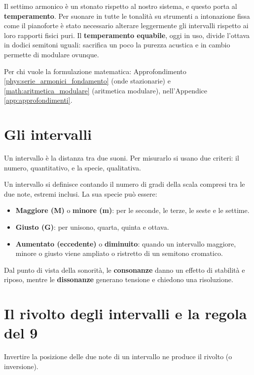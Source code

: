 Il settimo armonico è un \Sibemolle{} stonato rispetto al nostro sistema, e questo porta al \textbf{temperamento}. Per suonare in tutte le tonalità su strumenti a intonazione fissa come il pianoforte è stato necessario alterare leggermente gli intervalli rispetto ai loro rapporti fisici puri. Il \textbf{temperamento equabile}, oggi in uso, divide l'ottava in dodici semitoni uguali: sacrifica un poco la purezza acustica e in cambio permette di modulare ovunque.

Per chi vuole la formulazione matematica: Approfondimento \ref{phys:serie_armonici_fondamento} (onde stazionarie) e \ref{math:aritmetica_modulare} (aritmetica modulare), nell'Appendice \ref{app:approfondimenti}.

\section{Gli intervalli}
\label{sec:intervalli}

Un intervallo è la distanza tra due suoni. Per misurarlo si usano due criteri: il numero, quantitativo, e la specie, qualitativa.

\begin{definizione}
	\label{def:intervalli}
	Un intervallo si definisce contando il numero di gradi della scala compresi tra le due note, estremi inclusi. La sua specie può essere:
	\begin{itemize}
		\item \textbf{Maggiore (M)} o \textbf{minore (m)}: per le seconde, le terze, le seste e le settime.
		\item \textbf{Giusto (G)}: per unisono, quarta, quinta e ottava.
		\item \textbf{Aumentato (eccedente)} o \textbf{diminuito}: quando un intervallo maggiore, minore o giusto viene ampliato o ristretto di un semitono cromatico.
	\end{itemize}
\end{definizione}

Dal punto di vista della sonorità, le \textbf{consonanze} danno un effetto di stabilità e riposo, mentre le \textbf{dissonanze} generano tensione e chiedono una risoluzione.

\section{Il rivolto degli intervalli e la regola del 9}
\label{sec:rivolto_intervalli}

Invertire la posizione delle due note di un intervallo ne produce il rivolto (o inversione).

